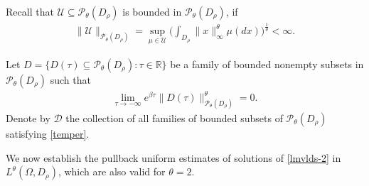\documentclass[11pt]{article}
\numberwithin{equation}{section}
\theoremstyle{plain}
\begin{document}
Recall that
 $ \mathcal{U} \subseteq \mathcal{P}_\theta(D_{\rho}) $ is  bounded in $ \mathcal{P}_\theta(D_{\rho}) $,
 if
 \begin{align*}
    \|\mathcal{U}\|_{\mathcal{P}_{\theta}(D_{\rho})}
    = \sup_{\mu \in \mathcal{U}}
         \Big( \int_{D_{\rho}} \|x\|_{\infty}^\theta \mu(dx)
         \Big)^{\frac{1}{\theta}} <  \infty.
 \end{align*}

 Let $D = \{ D(\tau) \subseteq \mathcal{P}_{\theta}(D_{\rho}): \tau \in \mathbb{R} \}$
 be a family of bounded nonempty subsets in $\mathcal{P}_{\theta}(D_{\rho})$
 such that
 \begin{align} \label{temper}
    \lim_{\tau \to -\infty}
          e^{\beta \tau}
          \|D(\tau)\|^{\theta}_{\mathcal{P}_{\theta}(D_{\rho})}
     = 0.
 \end{align}
 Denote by $\mathcal{D}$ the collection of all families of bounded subsets of $\mathcal{P}_{\theta}(D_{\rho})$
 satisfying \eqref{temper}.

 We now establish the pullback uniform estimates of solutions of \eqref{lmvlds-2} in $ L^{\theta}(\Omega, D_{\rho}) $,
 which are also valid for $\theta =2$.
\end{document}
